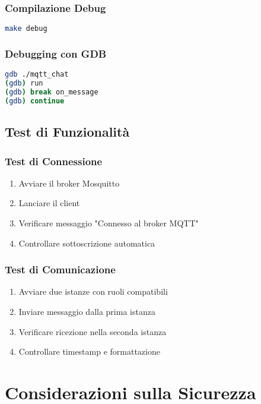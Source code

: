 \documentclass[12pt,a4paper]{article}
\begin{document}
\subsubsection{Compilazione Debug}
\begin{lstlisting}[language=bash]
make debug
\end{lstlisting}

\subsubsection{Debugging con GDB}
\begin{lstlisting}[language=bash]
gdb ./mqtt_chat
(gdb) run
(gdb) break on_message
(gdb) continue
\end{lstlisting}

\subsection{Test di Funzionalità}

\subsubsection{Test di Connessione}
\begin{enumerate}
    \item Avviare il broker Mosquitto
    \item Lanciare il client
    \item Verificare messaggio "Connesso al broker MQTT"
    \item Controllare sottoscrizione automatica
\end{enumerate}

\subsubsection{Test di Comunicazione}
\begin{enumerate}
    \item Avviare due istanze con ruoli compatibili
    \item Inviare messaggio dalla prima istanza
    \item Verificare ricezione nella seconda istanza
    \item Controllare timestamp e formattazione
\end{enumerate}

\section{Considerazioni sulla Sicurezza}
\end{document}
